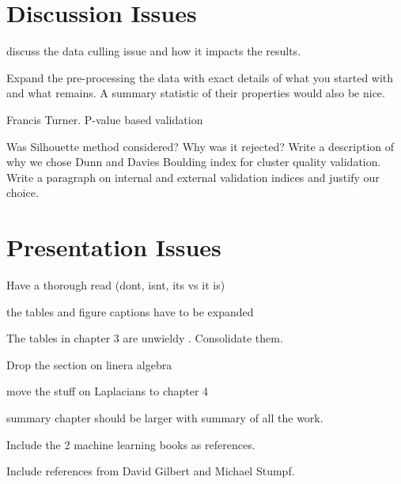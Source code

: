 \documentclass[a4paper,10pt]{article}
\begin{document}
\section{Discussion Issues}

\begin{description}
  \item discuss the data culling issue and how it impacts the results.
  \item Expand the pre-processing the data with exact details of what you started with and what remains. A summary statistic of their properties would also be nice.
  \item Francis Turner. P-value based validation
  \item Was Silhouette method considered? Why was it rejected? Write a description of why we chose Dunn and Davies Boulding index for cluster quality validation. Write a paragraph on internal and external validation indices and justify our choice.
\end{description}

\section{Presentation Issues}
\begin{description}
    \item Have a thorough read (dont, isnt, its vs it is)
    \item the tables and figure captions have to be expanded
    \item The tables in chapter 3 are unwieldy . Consolidate them.
    \item Drop the section on linera algebra
    \item move the stuff on Laplacians to chapter 4
    \item summary chapter should be larger with summary of all the work.	
    \item Include the 2 machine learning books as references.
    \item Include references from David Gilbert and Michael Stumpf.
    
\end{description}
\end{document}
